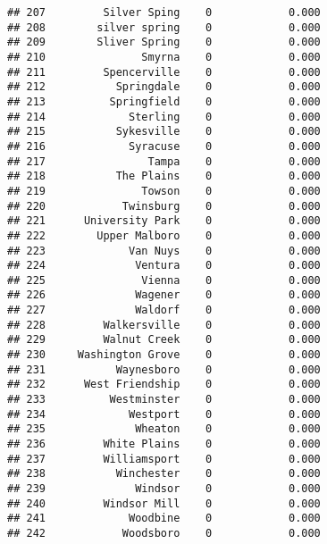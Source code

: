 \documentclass[]{article}
\newenvironment{Shaded}{\begin{snugshade}}{\end{snugshade}}
\newcommand{\KeywordTok}[1]{\textcolor[rgb]{0.13,0.29,0.53}{\textbf{#1}}}
\newcommand{\DataTypeTok}[1]{\textcolor[rgb]{0.13,0.29,0.53}{#1}}
\newcommand{\DecValTok}[1]{\textcolor[rgb]{0.00,0.00,0.81}{#1}}
\newcommand{\StringTok}[1]{\textcolor[rgb]{0.31,0.60,0.02}{#1}}
\newcommand{\OperatorTok}[1]{\textcolor[rgb]{0.81,0.36,0.00}{\textbf{#1}}}
\newcommand{\NormalTok}[1]{#1}
\begin{document}
\begin{verbatim}
## 207         Silver Sping    0            0.000
## 208        silver spring    0            0.000
## 209        Sliver Spring    0            0.000
## 210               Smyrna    0            0.000
## 211         Spencerville    0            0.000
## 212           Springdale    0            0.000
## 213          Springfield    0            0.000
## 214             Sterling    0            0.000
## 215           Sykesville    0            0.000
## 216             Syracuse    0            0.000
## 217                Tampa    0            0.000
## 218           The Plains    0            0.000
## 219               Towson    0            0.000
## 220            Twinsburg    0            0.000
## 221      University Park    0            0.000
## 222        Upper Malboro    0            0.000
## 223             Van Nuys    0            0.000
## 224              Ventura    0            0.000
## 225               Vienna    0            0.000
## 226              Wagener    0            0.000
## 227              Waldorf    0            0.000
## 228         Walkersville    0            0.000
## 229         Walnut Creek    0            0.000
## 230     Washington Grove    0            0.000
## 231           Waynesboro    0            0.000
## 232      West Friendship    0            0.000
## 233          Westminster    0            0.000
## 234             Westport    0            0.000
## 235              Wheaton    0            0.000
## 236         White Plains    0            0.000
## 237         Williamsport    0            0.000
## 238           Winchester    0            0.000
## 239              Windsor    0            0.000
## 240         Windsor Mill    0            0.000
## 241             Woodbine    0            0.000
## 242            Woodsboro    0            0.000
\end{verbatim}

\begin{Shaded}
\end{Shaded}
\end{document}
